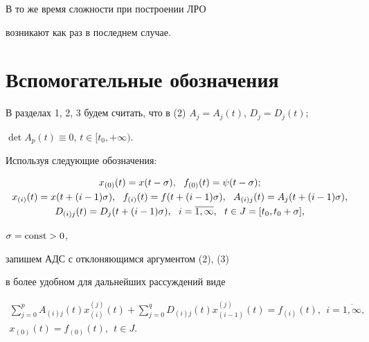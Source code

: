 В то же время сложности при построении ЛРО


возникают как раз в последнем случае.





\section{Вспомогательные обозначения}





В разделах 1, 2, 3 будем считать, что в (2) $A_j=A_j(t)$, $D_j=D_j(t)$;


$\det A_p(t) \equiv 0$, $t\in [t_0, +\infty)$.





Используя следующие обозначения:


\begin{gather}


x_{(0)}(t)=x(t-\sigma), \ \ f_{(0)}(t)=\psi(t-\sigma); \notag \\


%


x_{(i)}(t)=x(t+(i-1)\sigma), \ \ f_{(i)}(t)=f(t+(i-1)\sigma), 


\ \  A_{(i)j}(t)=A_j(t+(i-1)\sigma), \notag \\


D_{(i)j}(t)=D_j(t+(i-1)\sigma), \ \ i=\overline{1, \infty}, \ \


t \in J=[t_0,t_0+\sigma], 


\end{gather}


$\sigma=\operatorname{const} >0$,


запишем АДС с отклоняющимся аргументом (2), (3)


в более удобном для дальнейших рассуждений виде


\begin{gather}


\sum_{j=0}^{p}{A_{(i)j}(t)x_{(i)}^{(j)}(t)} +


\sum_{j=0}^{q}{D_{(i)j}(t)x_{(i-1)}^{(j)}(t)}=f_{(i)}(t),\ \


i=\overline{1,\infty}, \\


%


x_{(0)}(t)=f_{(0)}(t),\ \ t \in J.


\end{gather}





